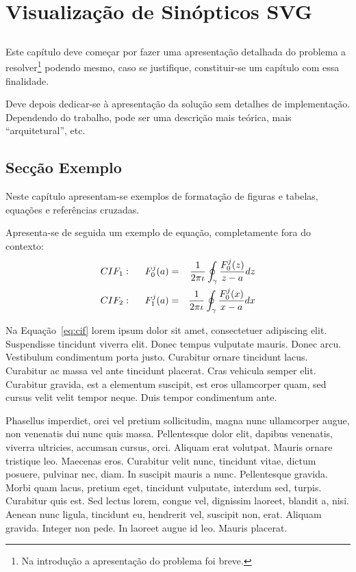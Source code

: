 \chapter{Visualização de Sinópticos SVG}\label{chap:chap3}

\section*{}

Este capítulo deve começar por fazer uma apresentação detalhada do
problema a resolver\footnote{Na introdução a apresentação do
  problema foi breve.} podendo mesmo, caso se justifique,
constituir-se um capítulo com essa finalidade.

Deve depois dedicar-se à apresentação da solução sem detalhes de
implementação. 
Dependendo do trabalho, pode ser uma descrição mais teórica, mais
``arquitetural'', etc.

\section{Secção Exemplo}

Neste capítulo apresentam-se exemplos de formatação de figuras e
tabelas, equações e referências cruzadas.

Apresenta-se de seguida um exemplo de equação, completamente fora do contexto:
\begin{eqnarray}
CIF_1: \hspace*{5mm}F_0^j(a) &=& \frac{1}{2\pi \iota} \oint_{\gamma} \frac{F_0^j(z)}{z - a} dz\\
CIF_2: \hspace*{5mm}F_1^j(a) &=& \frac{1}{2\pi \iota} \oint_{\gamma} \frac{F_0^j(x)}{x - a} dx \label{eq:cif}
\end{eqnarray}

Na Equação~\ref{eq:cif} lorem ipsum dolor sit amet, consectetuer
adipiscing elit. Suspendisse tincidunt viverra elit. Donec tempus
vulputate mauris. Donec arcu. Vestibulum condimentum porta
justo. Curabitur ornare tincidunt lacus. Curabitur ac massa vel ante
tincidunt placerat. Cras vehicula semper elit. Curabitur gravida, est
a elementum suscipit, est eros ullamcorper quam, sed cursus velit
velit tempor neque. Duis tempor condimentum ante.

Phasellus imperdiet, orci vel pretium sollicitudin, magna nunc
ullamcorper augue, non venenatis dui nunc quis massa. Pellentesque
dolor elit, dapibus venenatis, viverra ultricies, accumsan cursus,
orci. Aliquam erat volutpat. Mauris ornare tristique leo. Maecenas
eros. Curabitur velit nunc, tincidunt vitae, dictum posuere, pulvinar
nec, diam. In suscipit mauris a nunc. Pellentesque gravida. Morbi quam
lacus, pretium eget, tincidunt vulputate, interdum sed,
turpis. Curabitur quis est. Sed lectus lorem, congue vel, dignissim
laoreet, blandit a, nisi. Aenean nunc ligula, tincidunt eu, hendrerit
vel, suscipit non, erat. Aliquam gravida. Integer non pede. In laoreet
augue id leo. Mauris placerat. 

